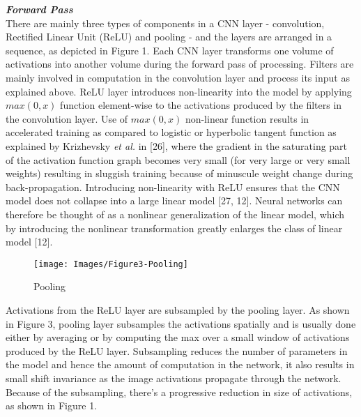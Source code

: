 \documentclass [11pt,letterpaper ,twoside ,openany ]{report}
\begin{document}
    \noindent
    \textbf{\textit{Forward Pass}} \\
    There are mainly three types of components in a CNN layer - convolution, Rectified Linear Unit (ReLU) and pooling - and the layers are arranged in a sequence, as depicted in Figure 1. Each CNN layer transforms one volume of activations into another volume during the forward pass of processing. Filters are mainly involved in computation in the convolution layer and process its input as explained above. ReLU layer introduces non-linearity into the model by applying \(max (0,x)\) function element-wise to the activations produced by the filters in the convolution layer. Use of \(max (0,x)\) non-linear function results in accelerated training as compared to logistic or hyperbolic tangent function as explained by Krizhevsky \textit {et al.} in [26], where the gradient in the saturating part of the activation function graph becomes very small (for very large or very small weights) resulting in sluggish training because of minuscule weight change during back-propagation. Introducing non-linearity with ReLU ensures that the CNN model does not collapse into a large linear model [27, 12]. Neural networks can therefore be thought of as a nonlinear generalization of the linear model, which by introducing the nonlinear transformation greatly enlarges the class of linear model [12].

    \begin{wrapfigure}{r}{0.6\textwidth}
        \begin{center}
            \texttt{[image: Images/Figure3-Pooling]}
        \end{center}
        \caption{Pooling}
    \end{wrapfigure}

    Activations from the ReLU layer are subsampled by the pooling layer. As shown in Figure 3, pooling layer subsamples the activations spatially and is usually done either by averaging or by computing the max over a small window of activations produced by the ReLU layer. Subsampling reduces the number of parameters in the model and hence the amount of computation in the network, it also results in small shift invariance as the image activations propagate through the network. Because of the subsampling, there's a progressive reduction in size of activations, as shown in Figure 1. \\
\end{document}
